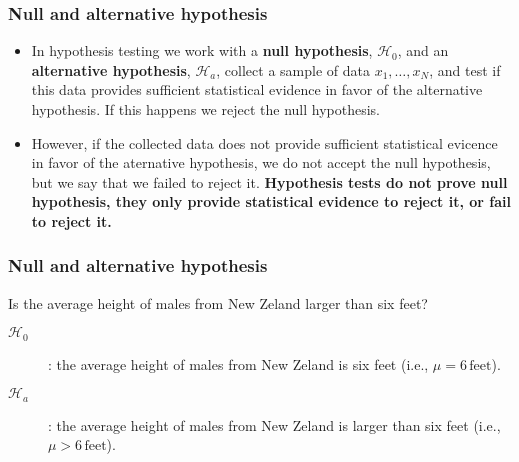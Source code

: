 \documentclass{beamer}
\begin{document}
\begin{frame}
\frametitle{Null and alternative hypothesis}

    \begin{itemize}

        \item In hypothesis testing we work with a \textbf{null hypothesis},
            $\mathcal{H}_0$, and an \textbf{alternative hypothesis},
            $\mathcal{H}_a$, collect a sample of data $x_1,\ldots,x_N$, and
            test if this data provides sufficient statistical evidence in favor
            of the alternative hypothesis. If this happens we reject the null
            hypothesis.

        \item However, if the collected data does not provide sufficient
            statistical evicence in favor of the aternative hypothesis, we do
            not accept the null hypothesis, but we say that we failed to reject
            it.  \textbf{Hypothesis tests do not prove null hypothesis, they
            only provide statistical evidence to reject it, or fail to reject it.}

    \end{itemize}

\end{frame}

\begin{frame}
\frametitle{Null and alternative hypothesis}

    \begin{example}

        Is the average height of males from New Zeland larger than six feet?

        \begin{description}

            \item[$\mathcal{H}_0$]: the average height of males from New Zeland
                is six feet (i.e., $\mu=6\,\text{feet}$).

            \item[$\mathcal{H}_a$]: the average height of males from New Zeland
                is larger than six feet (i.e., $\mu>6\,\text{feet}$).

        \end{description}

    \end{example}

\end{frame}
\end{document}
